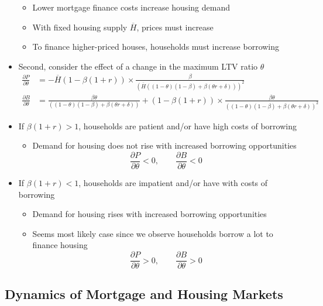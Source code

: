 \documentclass{article}
\numberwithin{equation}{section}
\numberwithin{figure}{section}
\begin{document}
\begin{itemize}
		\begin{itemize}
			\item Lower mortgage finance costs increase housing demand
			\item With fixed housing supply \( \overline{H} \), prices must increase
			\item To finance higher-priced houses, households must increase borrowing
		\end{itemize}
		\item Second, consider the effect of a \textcolor{myblue}{change in the maximum LTV ratio \( \theta \)}
		\begin{align*}
			\frac{\partial P}{\partial\theta} &= -\overline{H}(1-\beta(1+r)) \times \frac{\beta}{(\overline{H}((1-\theta)(1-\beta)+\beta(\theta r+\delta)))^2} \\
			\frac{\partial B}{\partial\theta} &= \frac{\beta\theta}{((1-\theta)(1-\beta)+\beta(\theta r+\delta))} + (1-\beta(1+r)) \times \frac{\beta\theta}{((1-\theta)(1-\beta)+\beta(\theta r+\delta))^2}
		\end{align*}
		\item If \( \beta(1+r) > 1 \), households are patient and/or have high costs of borrowing
		\begin{itemize}
			\item Demand for housing does not rise with increased borrowing opportunities
			\[
				\frac{\partial P}{\partial \theta} <0, \qquad \frac{\partial B}{\partial \theta} <0 
			\]
		\end{itemize}
		\item If \( \beta(1+r) < 1 \), households are impatient and/or have with costs of borrowing
		\begin{itemize}
			\item Demand for housing rises with increased borrowing opportunities
			\item Seems most likely case since we observe households borrow a lot to finance housing
			\[
				\frac{\partial P}{\partial \theta} >0, \qquad \frac{\partial B}{\partial \theta} >0 
			\]
		\end{itemize}
	\end{itemize}
\subsection{Dynamics of Mortgage and Housing Markets}
\end{document}
